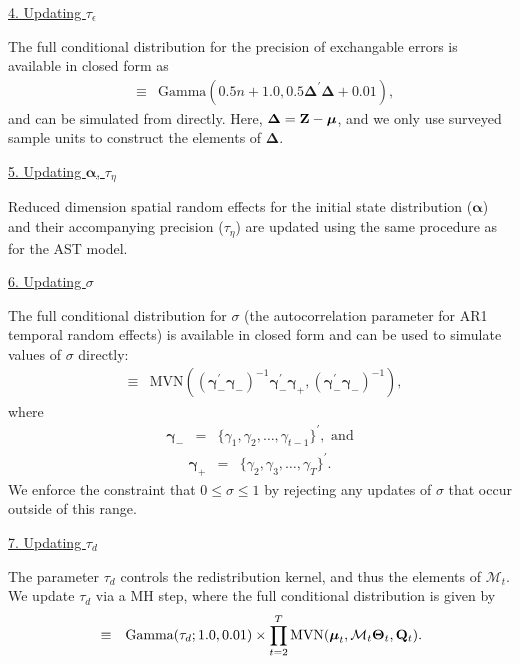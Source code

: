 \documentclass[12pt,fleqn]{article}
\begin{document}
\begin{flushleft}
\underline{4. Updating $\tau_\epsilon$}

The full conditional distribution for the precision of exchangable errors is available in closed form as
\begin{eqnarray*}
  [\tau_\epsilon | \cdot] & \equiv & \textrm{Gamma}(0.5n + 1.0,0.5 \boldsymbol{\Delta}^\prime \boldsymbol{\Delta} + 0.01),
\end{eqnarray*}
and can be simulated from directly.
 Here, $\boldsymbol{\Delta} = \bf{Z} - \boldsymbol{\mu}$, and we only use surveyed sample units to construct the elements of $\boldsymbol{\Delta}$.

\underline{5. Updating $\boldsymbol{\alpha}$, $\tau_\eta$}

Reduced dimension spatial random effects for the initial state distribution ($\boldsymbol{\alpha}$) and their accompanying precision ($\tau_\eta$) are updated using the same procedure as for the AST model.

\underline{6. Updating $\sigma$}

The full conditional distribution for $\sigma$ (the autocorrelation parameter for AR1 temporal random effects) is available in closed form and can be used to simulate values of $\sigma$ directly:
\begin{eqnarray*}
  [\sigma | \cdot] & \equiv & \textrm{MVN}( (\boldsymbol{\gamma}_-^\prime \boldsymbol{\gamma}_-)^{-1} \boldsymbol{\gamma}_-^\prime \boldsymbol{\gamma}_+, (\boldsymbol{\gamma}_-^\prime \boldsymbol{\gamma}_-)^{-1} ),
\end{eqnarray*}
where
\begin{eqnarray*}
   \boldsymbol{\gamma}_- & = & \{ \gamma_1, \gamma_2, \hdots, \gamma_{t-1} \}^\prime, \text{ and}
\end{eqnarray*}
\begin{eqnarray*}
   \boldsymbol{\gamma}_+ & = & \{ \gamma_2, \gamma_3, \hdots, \gamma_{T} \}^\prime.
\end{eqnarray*}
We enforce the constraint that $0 \le \sigma \le 1$ by rejecting any updates of $\sigma$ that occur outside of this range.


\underline{7.  Updating $\tau_d$}

The parameter $\tau_d$ controls the redistribution kernel, and thus the elements of $\mathcal{M}_t$.  We update
$\tau_d$ via a MH step, where the full conditional distribution is given by
\begin{eqnarray*}
  [\tau_d | \cdot] & \equiv & \textrm{Gamma}(\tau_d;1.0,0.01) \times  \prod_{t=2}^T \textrm{MVN}(\boldsymbol{\mu}_t, \mathcal{M}_t \boldsymbol{\Theta}_t,{\bf Q}_t).
\end{eqnarray*}



\end{flushleft}
\end{document}
